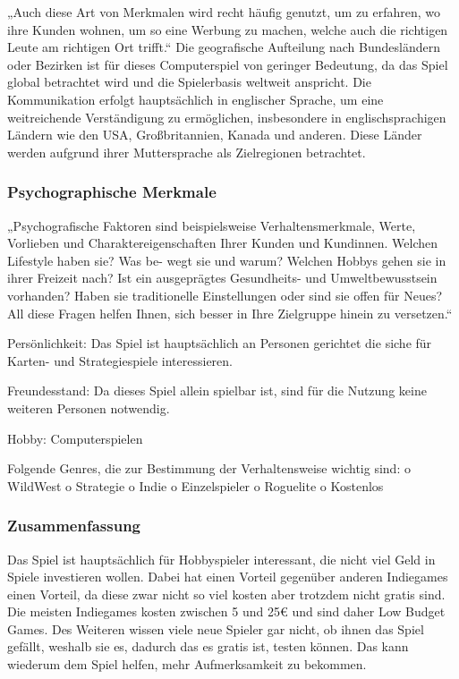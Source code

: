 „Auch diese Art von Merkmalen wird recht häufig genutzt, um zu erfahren, wo ihre Kunden wohnen, um so eine Werbung zu machen, welche auch die richtigen Leute am richtigen Ort trifft.“ \cite{GeographischeMerkmale}
Die geografische Aufteilung nach Bundesländern oder Bezirken ist für dieses Computerspiel von geringer Bedeutung, da das Spiel global betrachtet wird und die Spielerbasis weltweit anspricht.
Die Kommunikation erfolgt hauptsächlich in englischer Sprache, um eine weitreichende Verständigung zu ermöglichen, insbesondere in englischsprachigen Ländern wie den USA, Großbritannien, Kanada und anderen.
Diese Länder werden aufgrund ihrer Muttersprache als Zielregionen betrachtet.

\subsubsection{Psychographische Merkmale}\label{subsubsec:Psychographische-Merkmale}

„Psychografische Faktoren sind beispielsweise Verhaltensmerkmale, Werte, Vorlieben und Charaktereigenschaften Ihrer Kunden und Kundinnen. Welchen Lifestyle haben sie? Was be-
wegt sie und warum? Welchen Hobbys gehen sie in ihrer Freizeit nach? Ist ein ausgeprägtes Gesundheits- und Umweltbewusstsein vorhanden? Haben sie traditionelle Einstellungen oder
sind sie offen für Neues? All diese Fragen helfen Ihnen, sich besser in Ihre Zielgruppe hinein zu versetzen.“ \cite{PsychographischeMerkmale}

Persönlichkeit: Das Spiel ist hauptsächlich an Personen gerichtet die siche für Karten- und Strategiespiele interessieren.

Freundesstand: Da dieses Spiel allein spielbar ist, sind für die Nutzung keine weiteren Personen notwendig.

Hobby: Computerspielen

Folgende Genres, die zur Bestimmung der Verhaltensweise wichtig sind:
o WildWest
o Strategie
o Indie
o Einzelspieler
o Roguelite
o Kostenlos


\subsubsection{Zusammenfassung}\label{subsubsec:Zusammenfassung}
Das Spiel ist hauptsächlich für Hobbyspieler interessant, die nicht viel Geld in Spiele investieren wollen. Dabei hat \ff einen Vorteil gegenüber anderen Indiegames einen Vorteil,
da diese zwar nicht so viel kosten aber trotzdem nicht gratis sind. Die meisten Indiegames kosten zwischen 5 und 25€ und sind daher Low Budget Games.\cite[.vgl]{IndiegamesPreis}
Des Weiteren wissen viele neue Spieler gar nicht, ob ihnen das Spiel gefällt, weshalb sie es, dadurch das es gratis ist, testen können. Das
kann wiederum dem Spiel helfen, mehr Aufmerksamkeit zu bekommen.


\renewcommand{\kapitelautor}{}
